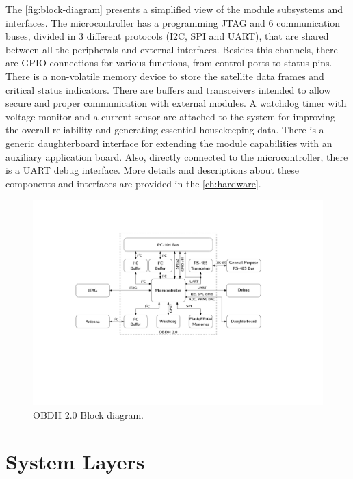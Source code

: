 The \autoref{fig:block-diagram} presents a simplified view of the module subsystems and interfaces. The microcontroller has a programming JTAG and 6 communication buses, divided in 3 different protocols (I2C, SPI and UART), that are shared between all the peripherals and external interfaces. Besides this channels, there are GPIO connections for various functions, from control ports to status pins. There is a non-volatile memory device to store the satellite data frames and critical status indicators. There are buffers and transceivers intended to allow secure and proper communication with external modules. A watchdog timer with voltage monitor and a current sensor are attached to the system for improving the overall reliability and generating essential housekeeping data. There is a generic daughterboard interface for extending the module capabilities with an auxiliary application board. Also, directly connected to the microcontroller, there is a UART debug interface. More details and descriptions about these components and interfaces are provided in the \autoref{ch:hardware}. 

\begin{figure}[!ht]
    \begin{center}
        \includegraphics[width=\textwidth]{figures/block_diagram.pdf}
        \caption{OBDH 2.0 Block diagram.}
        \label{fig:block-diagram}
    \end{center}
\end{figure}

\section{System Layers}

